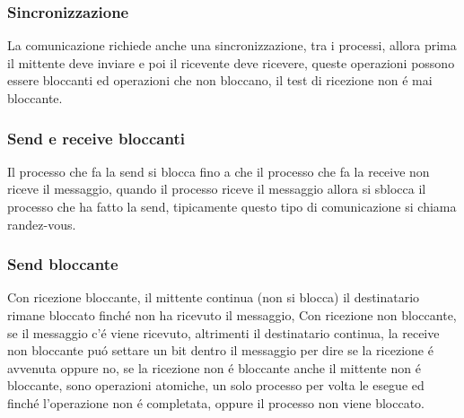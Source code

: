 \subsubsection{Sincronizzazione}
La comunicazione richiede anche una sincronizzazione, tra i processi, allora prima il mittente deve inviare e poi il ricevente deve ricevere,
queste operazioni possono essere bloccanti ed operazioni che non bloccano, il test di ricezione non é mai bloccante.
\subsubsection*{Send e receive bloccanti}
Il processo che fa la send si blocca fino a che il processo che fa la receive non riceve il messaggio, quando il processo riceve il messaggio allora
si sblocca il processo che ha fatto la send, tipicamente questo tipo di comunicazione si chiama randez-vous.
\subsubsection*{Send  bloccante}
Con ricezione bloccante, il mittente continua (non si blocca) il destinatario rimane bloccato finché non ha ricevuto il messaggio,
Con ricezione non bloccante, se il messaggio c'é viene ricevuto, altrimenti il destinatario continua, la receive non bloccante puó settare un bit dentro il messaggio
per dire se la ricezione é avvenuta oppure no, se la ricezione non é bloccante anche il mittente non é bloccante, sono operazioni atomiche, un solo processo per volta le esegue ed
finché l'operazione non é completata, oppure il processo non viene bloccato.





















































